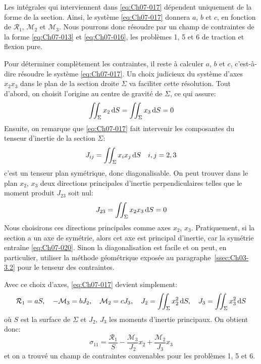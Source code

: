 Les intégrales qui interviennent dans \eqref{eq:Ch07-017} dépendent uniquement de la forme de la section.
Ainsi, le système \eqref{eq:Ch07-017} donnera $a$, $b$ et $c$, en fonction de $\mathcal{R}_1$, $\mathcal{M}_2$ et $\mathcal{M}_3$.
Nous pourrons donc résoudre par un champ de contraintes de la forme \eqref{eq:Ch07-013} et \eqref{eq:Ch07-016}, les problèmes 1, 5 et 6 de traction et flexion pure.

Pour déterminer complètement les contraintes, il reste à calculer $a$, $b$ et $c$, c'est-à-dire résoudre le système \eqref{eq:Ch07-017}.
Un choix judicieux du système d'axes $x_2x_3$ dans le plan de la section droite $\Sigma$ va faciliter cette résolution.
Tout d'abord, on choisit l'origine au centre de gravité de $\Sigma$, ce qui assure:
\begin{equation}
    \iint_{\Sigma} x_2 \mathop{\mathrm{{}d}}\mathopen{} S = \iint_{\Sigma} x_3 \mathop{\mathrm{{}d}}\mathopen{} S = 0
    \label{eq:Ch07-018}
\end{equation}
Ensuite, on remarque que \eqref{eq:Ch07-017} fait intervenir les composantes du tenseur d'inertie de la section $\Sigma$:
\begin{equation}
    J_{ij} = \iint_{\Sigma} x_i x_j \mathop{\mathrm{{}d}}\mathopen{} S \quad i,j = 2,3
    \label{eq:Ch07-019}
\end{equation}
c'est un tenseur plan symétrique, donc diagonalisable.
On peut trouver dans le plan $x_2$, $x_3$ deux directions principales d'inertie perpendiculaires telles que le moment produit $J_{23}$ soit nul:
\begin{equation}
    J_{23} = \iint_{\Sigma} x_2 x_3 \mathop{\mathrm{{}d}}\mathopen{} S = 0
    \label{eq:Ch07-020}
\end{equation}
Nous choisirons ces directions principales comme axes $x_2$, $x_3$.
Pratiquement, si la section a un axe de symétrie, alors cet axe est principal d'inertie, car la symétrie entraîne \eqref{eq:Ch07-020}.
Sinon la diagonalisation est facile et on peut, en particulier, utiliser la méthode géométrique exposée au paragraphe~\ref{ssec:Ch03-3.2} pour le tenseur des contraintes.

Avec ce choix d'axes, \eqref{eq:Ch07-017} devient simplement:
\begin{equation}
    \mathcal{R}_1 = a S, \quad -\mathcal{M}_3 = b J_2, \quad \mathcal{M}_2 = c J_3, \quad J_2 = \iint_{\Sigma} x_2^2 \mathop{\mathrm{{}d}}\mathopen{} S, \quad J_3 = \iint_{\Sigma} x_3^2 \mathop{\mathrm{{}d}}\mathopen{} S
    \label{eq:Ch07-021}
\end{equation}
où $S$ est la surface de $\Sigma$ et $J_2$, $J_3$ les moments d'inertie principaux.
On obtient donc:
\begin{equation}
    \sigma_{11} = \frac{\mathcal{R}_1}{S} - \frac{\mathcal{M}_3}{J_2} x_2 + \frac{\mathcal{M}_2}{J_3}x_3
    \label{eq:Ch07-022}
\end{equation}
et on a trouvé un champ de contraintes convenables pour les problèmes 1, 5 et 6.

